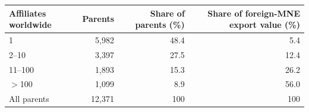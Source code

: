 \begin{tabular}{lrrr}
\toprule
Affiliates worldwide & Parents & Share of parents (\%) & Share of foreign-MNE export value (\%) \\
\midrule
1 & 5,982 & 48.4 & 5.4 \\
2--10 & 3,397 & 27.5 & 12.4 \\
11--100 & 1,893 & 15.3 & 26.2 \\
$>$100 & 1,099 & 8.9 & 56.0 \\
\midrule
All parents & 12,371 & 100 & 100 \\
\bottomrule
\end{tabular}
